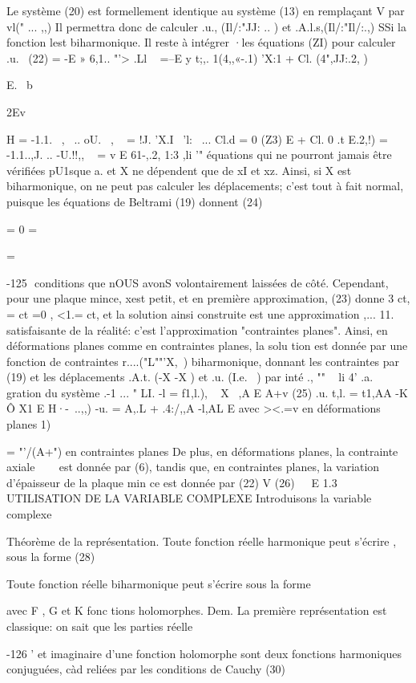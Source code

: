 Le système (20) est formellement identique au système (13) en remplaçant V 
par vl(" ... ,,) Il permettra donc de calculer .u., (Il/:"JJ: .. ) et .A.l.s,(Il/:"Il/:.,) SSi la 
fonction lest biharmonique. Il reste à intégrer ·les équations (ZI) pour 
calculer .u.~ 
(22) 
= -E » 6,1.. "'> .Ll ~ =--E y t;,. 1(4,,«-.1) 'X:1 + Cl. (4",JJ:.2, ) 

E. 
~b 
{ 2Ev 



H = -1.1. ~,~ .. oU. ~, ~ = !J. 'X.I~ 'l:~ ... Cl.d = 0 
(Z3) E 
+ Cl. 0
.t E.2,!) = -1.1..,J. .. -U.!!,, ~ = v E 61-,.2, 1:3 ,li '" 
équations qui ne pourront jamais être vérifiées pU1sque a. et X ne dépendent 
que de xI et xz. Ainsi, si X est biharmonique, on ne peut pas calculer les déplacements; c'est tout à fait normal, puisque les équations de Beltrami (19) 
donnent 
(24) 

= 0
= 

= 

-125 ­
conditions que nOUS avonS volontairement laissées de côté. Cependant, pour 
une plaque mince, xest petit, et en première approximation, (23) donne
3 ct, = ct =0 , <1.= ct, et la solution ainsi construite est une approximation
,... 11. satisfaisante de la réalité: c'est l'approximation "contraintes planes". 
Ainsi, en déformations planes comme en contraintes planes, la solu­
tion est donnée par une fonction de contraintes r....("L""'X,~) biharmonique, donnant les contraintes par (19) et les déplacements .A.t. (-X -X ) et .u. (I.e. ~) par inté­
., "" ~ li 4' .a. 
gration du système 
.-1 ... " 
LI. -l{
= f1,l.), ~ X}
~,A 
E 
A+v
(25) 
.u. 
t,l. = t1,AA -K Ô X1 
E 
H·-\ ..,,)
-u. = 
A,.L + .4:/,,A -l,AL
E 
avec ><.=v en déformations planes 1){ = "'/(A+") en contraintes planes De plus, en déformations planes, la contrainte axiale ~~~ est donnée par (6), 
tandis que, en contraintes planes, la variation d'épaisseur de la plaque min­
ce est donnée par (22) 
V
(26) 
~ ­
E 
1.3 UTILISATION DE LA VARIABLE COMPLEXE 
Introduisons la variable complexe 

Théorème de la représentation. Toute fonction réelle harmonique peut s'écrire 
, 
sous la forme 
(28) 


Toute fonction réelle biharmonique peut s'écrire sous la forme 

avec F , G et K fonc tions holomorphes. 
Dem. La première représentation est classique: on sait que les parties réelle 

-126 '­
et imaginaire d'une fonction holomorphe sont deux fonctions harmoniques con­juguées, càd reliées par les conditions de Cauchy 
(30) 

}}
